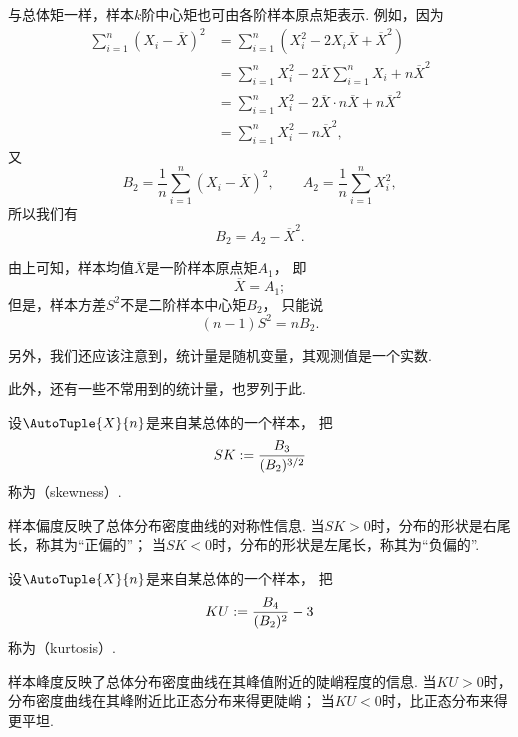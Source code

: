 与总体矩一样，样本\(k\)阶中心矩也可由各阶样本原点矩表示.
例如，因为\begin{align*}
	\sum_{i=1}^n (X_i-\overline{X})^2
	&= \sum_{i=1}^n (X_i^2 - 2 X_i \overline{X} + \overline{X}^2) \\
	&= \sum_{i=1}^n X_i^2
		- 2 \overline{X} \sum_{i=1}^n X_i
		+ n \overline{X}^2 \\
	&= \sum_{i=1}^n X_i^2
		- 2 \overline{X} \cdot n \overline{X}
		+ n \overline{X}^2 \\
	&= \sum_{i=1}^n X_i^2
			- n \overline{X}^2,
\end{align*}
又\[
	B_2 = \frac1n \sum_{i=1}^n (X_i-\overline{X})^2,
	\qquad
	A_2 = \frac1n \sum_{i=1}^n X_i^2,
\]
所以我们有\begin{equation}\label{equation:统计量.2阶中心矩-2阶原点矩-均值的关系}
	B_2
	= A_2 - \overline{X}^2.
\end{equation}

由上可知，样本均值\(\overline{X}\)是一阶样本原点矩\(A_1\)，
即\begin{equation}\label{equation:统计量.均值-1阶原点矩的关系}
	\overline{X} = A_1;
\end{equation}
但是，样本方差\(S^2\)不是二阶样本中心矩\(B_2\)，
只能说\begin{equation}\label{equation:统计量.方差-2阶中心矩的关系}
	(n-1) S^2 = n B_2.
\end{equation}

另外，我们还应该注意到，统计量是随机变量，其观测值是一个实数.

此外，还有一些不常用到的统计量，也罗列于此.
\begin{definition}
设\(\AutoTuple{X}{n}\)是来自某总体的一个样本，
把\begin{equation}
	SK := \frac{B_3}{(B_2)^{3/2}}
\end{equation}
称为（skewness）.
\end{definition}
样本偏度反映了总体分布密度曲线的对称性信息.
当\(SK > 0\)时，分布的形状是右尾长，称其为“正偏的”；
当\(SK < 0\)时，分布的形状是左尾长，称其为“负偏的”.

\begin{definition}
设\(\AutoTuple{X}{n}\)是来自某总体的一个样本，
把\begin{equation}
	KU := \frac{B_4}{(B_2)^2} - 3
\end{equation}
称为（kurtosis）.
\end{definition}
样本峰度反映了总体分布密度曲线在其峰值附近的陡峭程度的信息.
当\(KU > 0\)时，分布密度曲线在其峰附近比正态分布来得更陡峭；
当\(KU < 0\)时，比正态分布来得更平坦.

